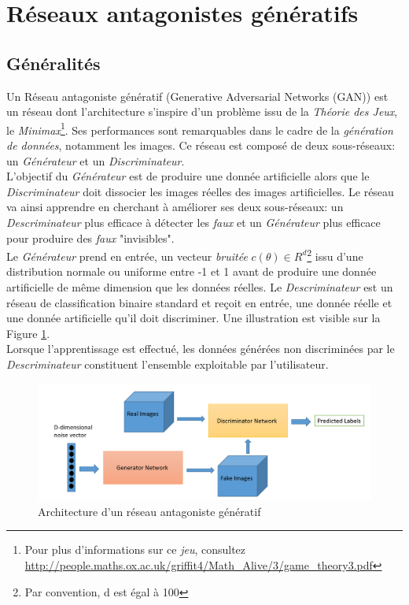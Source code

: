 \section{Réseaux antagonistes génératifs}
\subsection{Généralités}
Un Réseau antagoniste génératif\cite{gan} (Generative Adversarial Networks (GAN)) est un réseau dont l'architecture s'inspire d'un problème issu de la \textit{Théorie des Jeux}, le \textit{Minimax}\footnote{Pour plus d'informations sur ce \textit{jeu}, consultez \url{http://people.maths.ox.ac.uk/griffit4/Math_Alive/3/game_theory3.pdf}}. Ses performances sont remarquables dans le cadre de la \textit{génération de données}, notamment les images. Ce réseau est composé de deux sous-réseaux: un \textit{Générateur} et un \textit{Discriminateur}.\\

\noindent L'objectif du \textit{Générateur} est de produire une donnée artificielle alors que le \textit{Discriminateur} doit dissocier les images réelles des images artificielles. Le réseau va ainsi apprendre en cherchant à améliorer ses deux sous-réseaux: un \textit{Descriminateur} plus efficace à détecter les \textit{faux} et un \textit{Générateur} plus efficace pour produire des \textit{faux} "invisibles". \\

\noindent Le \textit{Générateur} prend en entrée, un vecteur \textit{bruitée} $c(\theta) \in R^d$\footnote{Par convention, d est égal à 100} issu d'une distribution normale ou uniforme entre -1 et 1 avant de produire une donnée artificielle de même dimension que les données réelles. Le \textit{Descriminateur} est un réseau de classification binaire standard et reçoit en entrée, une donnée réelle et une donnée artificielle qu'il doit discriminer. Une illustration est visible sur la Figure \ref{ganarchi}.\\

\noindent Lorsque l'apprentissage est effectué, les données générées non discriminées par le \textit{Descriminateur} constituent l'ensemble exploitable par l'utilisateur.

\begin{figure}
    \centering
    \includegraphics[scale=0.3]{./tex/generative-adversarial-network/ganpic.png}
    \caption{Architecture d'un réseau antagoniste génératif}
    \label{ganarchi}
\end{figure}

